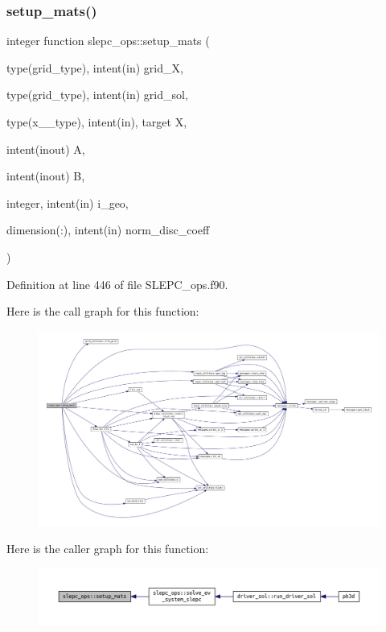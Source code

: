 \subsubsection{\texorpdfstring{setup\+\_\+mats()}{setup\_mats()}}
{\footnotesize\ttfamily integer function slepc\+\_\+ops\+::setup\+\_\+mats (\begin{DoxyParamCaption}\item[{type(grid\+\_\+type), intent(in)}]{grid\+\_\+X,  }\item[{type(grid\+\_\+type), intent(in)}]{grid\+\_\+sol,  }\item[{type(x\+\_\+2\+\_\+type), intent(in), target}]{X,  }\item[{intent(inout)}]{A,  }\item[{intent(inout)}]{B,  }\item[{integer, intent(in)}]{i\+\_\+geo,  }\item[{dimension(\+:), intent(in)}]{norm\+\_\+disc\+\_\+coeff }\end{DoxyParamCaption})}



Definition at line 446 of file S\+L\+E\+P\+C\+\_\+ops.\+f90.

Here is the call graph for this function\+:
\nopagebreak
\begin{figure}[H]
\begin{center}
\leavevmode
\includegraphics[width=350pt]{namespaceslepc__ops_af8aa2b9b7c5154ebd595afce3f5ebcd0_cgraph}
\end{center}
\end{figure}
Here is the caller graph for this function\+:
\nopagebreak
\begin{figure}[H]
\begin{center}
\leavevmode
\includegraphics[width=350pt]{namespaceslepc__ops_af8aa2b9b7c5154ebd595afce3f5ebcd0_icgraph}
\end{center}
\end{figure}
\mbox{\label{namespaceslepc__ops_ad9d4a9b7275ac5a6b9b35e481a7c1710}} 
